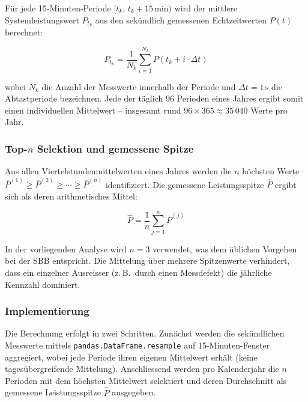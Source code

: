 \documentclass[12pt,oneside]{article}
\begin{document}
Für jede 15-Minuten-Periode $[t_k,\, t_k + 15\,\text{min})$ wird der mittlere
Systemleistungswert $\overline{P}_{t_k}$ aus den sekündlich gemessenen
Echtzeitwerten $P(t)$ berechnet:

\begin{equation}
  \overline{P}_{t_k} = \frac{1}{N_k} \sum_{i=1}^{N_k} P(t_k + i \cdot \Delta t)
  \label{eq:viertelstundenmittel}
\end{equation}

\noindent wobei $N_k$ die Anzahl der Messwerte innerhalb der Periode und
$\Delta t = 1\,\text{s}$ die Abtastperiode bezeichnen.
Jede der täglich 96 Perioden eines Jahres ergibt somit einen individuellen
Mittelwert -- insgesamt rund $96 \times 365 \approx 35\,040$ Werte pro Jahr.

\subsubsection*{Top-$n$ Selektion und gemessene Spitze}

Aus allen Viertelstundenmittelwerten eines Jahres werden die $n$ höchsten
Werte $\overline{P}^{(1)} \geq \overline{P}^{(2)} \geq \cdots \geq \overline{P}^{(n)}$
identifiziert. Die gemessene Leistungsspitze $\hat{P}$ ergibt sich als deren
arithmetisches Mittel:

\begin{equation}
  \hat{P} = \frac{1}{n} \sum_{j=1}^{n} \overline{P}^{(j)}
  \label{eq:gemessene_spitze}
\end{equation}

\noindent In der vorliegenden Analyse wird $n = 3$ verwendet, was dem üblichen
Vorgehen bei der SBB entspricht. Die Mittelung über mehrere Spitzenwerte
verhindert, dass ein einzelner Ausreisser (z.\,B.\ durch einen Messdefekt)
die jährliche Kennzahl dominiert.

\subsubsection*{Implementierung}

Die Berechnung erfolgt in zwei Schritten. Zunächst werden die sekündlichen
Messwerte mittels \texttt{pandas.DataFrame.resample} auf 15-Minuten-Fenster
aggregiert, wobei jede Periode ihren eigenen Mittelwert erhält (keine
tagesübergreifende Mittelung). Anschliessend werden pro Kalenderjahr die
$n$ Perioden mit dem höchsten Mittelwert selektiert und deren Durchschnitt
als gemessene Leistungsspitze $\hat{P}$ ausgegeben.
\end{document}
